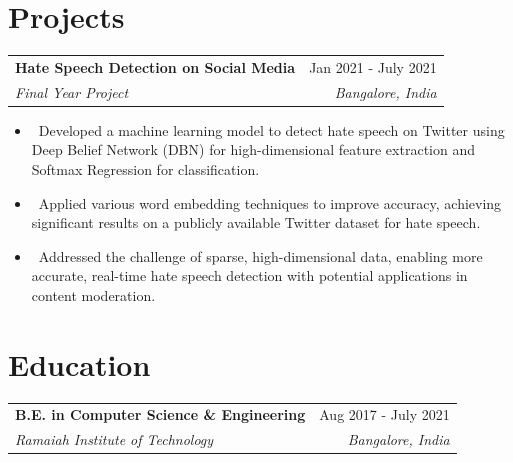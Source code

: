 \documentclass[letterpaper,10.99pt]{article}
\makeatletter
\newcommand{\resumeItem}[1]{\item\small{#1}}
\newcommand{\resumeSubheading}[4]{
\vspace{-1pt}\item
\begin{tabular*}{0.97\textwidth}[t]{l@{\extracolsep{\fill}}r}
\textbf{#1} & #2 \\
\textit{#3} & \textit{#4} \\
\end{tabular*}\vspace{-7pt}
}
\newcommand{\resumeSubHeadingList}{\begin{itemize}[leftmargin=0.10in, label={}]}
\newcommand{\resumeSubHeadingListEnd}{\end{itemize}}
\makeatother
\begin{document}
\begin{minipage}[t]{0.60\textwidth}
    

\section{Projects}
\resumeSubheading
{Hate Speech Detection on Social Media}{Jan 2021 - July 2021}
{Final Year Project}{Bangalore, India}
\resumeSubHeadingList
    \resumeItem{\textbullet\ Developed a machine learning model to detect 
        hate speech on Twitter using Deep Belief Network (DBN) for high-dimensional 
        feature extraction and Softmax Regression for classification.}
    \resumeItem{\textbullet\ Applied various word embedding techniques to improve accuracy, 
        achieving significant results on a publicly available Twitter dataset for hate speech.}
    \resumeItem{\textbullet\ Addressed the challenge of sparse, high-dimensional data, 
        enabling more accurate, real-time hate speech detection with potential applications in 
        content moderation.}
\resumeSubHeadingListEnd
\sectionsep

\section{Education}
\resumeSubheading
{B.E. in Computer Science \& Engineering}{Aug 2017 - July 2021}
{Ramaiah Institute of Technology}{Bangalore, India}
\sectionsep
    
%
%
    
\end{minipage}
\hfill
\end{document}
